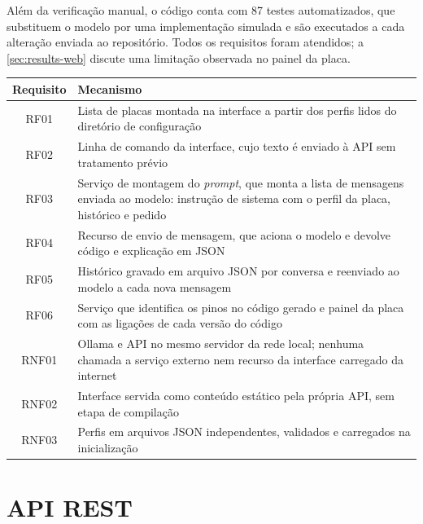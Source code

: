 Além da verificação manual, o código conta com 87 testes automatizados, que substituem o modelo por uma implementação simulada e são executados a cada alteração enviada ao repositório. Todos os requisitos foram atendidos; a \autoref{sec:results-web} discute uma limitação observada no painel da placa.

\begin{quadro}[!htb]
  \centering
  \caption{Mecanismo de implementação que atende cada requisito}
  \label{qua:requirements-coverage}
  \begin{tabularx}{\textwidth}{|c|X|}
    \hline
    \textbf{Requisito} & \textbf{Mecanismo} \\
    \hline
    RF01 & Lista de placas montada na interface a partir dos perfis lidos do diretório de configuração \\
    \hline
    RF02 & Linha de comando da interface, cujo texto é enviado à API sem tratamento prévio \\
    \hline
    RF03 & Serviço de montagem do \textit{prompt}, que monta a lista de mensagens enviada ao modelo: instrução de sistema com o perfil da placa, histórico e pedido \\
    \hline
    RF04 & Recurso de envio de mensagem, que aciona o modelo e devolve código e explicação em JSON \\
    \hline
    RF05 & Histórico gravado em arquivo JSON por conversa e reenviado ao modelo a cada nova mensagem \\
    \hline
    RF06 & Serviço que identifica os pinos no código gerado e painel da placa com as ligações de cada versão do código \\
    \hline
    RNF01 & Ollama e API no mesmo servidor da rede local; nenhuma chamada a serviço externo nem recurso da interface carregado da internet \\
    \hline
    RNF02 & Interface servida como conteúdo estático pela própria API, sem etapa de compilação \\
    \hline
    RNF03 & Perfis em arquivos JSON independentes, validados e carregados na inicialização \\
    \hline
  \end{tabularx}
\end{quadro}

\section{API REST}
\label{sec:results-api}

